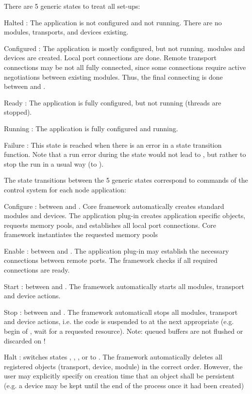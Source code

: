 There are 5 generic states to treat all set-ups: 
\begin{compactdesc}
\item[Halted] : The application is not configured and not running. 
	 There are no modules, transports, and devices existing.
\item[Configured] : The application is mostly configured, but not running. 
	 modules and devices are created. Local port connections are done.
	  Remote transport connections may be not all fully connected, 
	  since some connections require active negotiations between existing 
	  modules. Thus, the final connecting is done between 
	   and .  
\item[Ready] : The application is fully configured, but not running 
	 (threads are stopped).
\item[Running] : The application is fully configured and running.
\item[Failure] : This state is reached when there is an error in a 
	 state transition function. Note that a run error during the 
	  state would not lead to , but rather to stop 
	 the run in a usual way (to ).
\end{compactdesc}

The state transitions between the 5 generic states correspond to 
      commands of the control system for each node application:
\begin{compactdesc}
\item[Configure] : between  and . Core 
	 framework automatically creates standard modules and 
	 devices. The application plug-in  creates application 
	 specific objects, requests memory pools, and establishes all 
	 local port connections. Core framework instantiates the 
	 requested memory pools
\item[Enable] : between  and . 
	 The application plug-in may establish the necessary 
	 connections between remote ports. The framework checks if 
	 all required connections are ready.
\item[Start]  : between  and . The framework automatically 
	 starts all modules, transport and device actions.
\item[Stop] : between  and . The framework automaticall 
	 stops all modules, transport and device actions, 
	 i.e. the code is suspended to  at the next appropriate 
	  (e.g. begin of , wait for a requested resource). 
	 Note: queued buffers are not flushed or discarded on  !
\item[Halt] : switches states  ,  , , or 
	  to . The framework automatically deletes all 
	 registered objects (transport, device, module) 
	 in the correct order. However, the user may explicitly specify on 
	 creation time that an object shall be persistent (e.g. a device may 
	 be kept until the end of the process once it had been created) 
\end{compactdesc}


